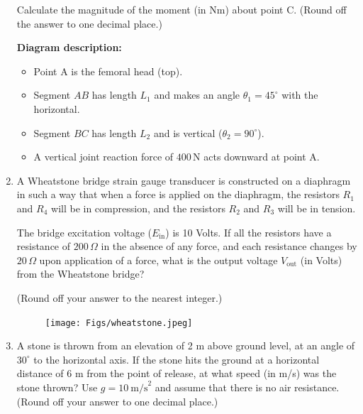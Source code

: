 \documentclass[journal]{IEEEtran}
\begin{document}
\begin{enumerate}
Calculate the magnitude of the moment (in Nm) about point C. (Round off the answer to one decimal place.)

\vspace{1em}
\textbf{Diagram description:}

\begin{itemize}
  \item Point A is the femoral head (top).
  \item Segment \( AB \) has length \( L_1 \) and makes an angle \( \theta_1 = 45^\circ \) with the horizontal.
  \item Segment \( BC \) has length \( L_2 \) and is vertical (\( \theta_2 = 90^\circ \)).
  \item A vertical joint reaction force of \( 400 \, \text{N} \) acts downward at point A.
\end{itemize}
\hfill{}

\item 
A Wheatstone bridge strain gauge transducer is constructed on a diaphragm in such a way that when a force is applied on the diaphragm, the resistors \( R_1 \) and \( R_4 \) will be in compression, and the resistors \( R_2 \) and \( R_3 \) will be in tension.

\vspace{1em}
The bridge excitation voltage (\( E_{\text{in}} \)) is 10 Volts. If all the resistors have a resistance of \( 200 \, \Omega \) in the absence of any force, and each resistance changes by \( 20 \, \Omega \) upon application of a force, what is the output voltage \( V_{\text{out}} \) (in Volts) from the Wheatstone bridge? 

(Round off your answer to the nearest integer.)
\begin{figure}[H]
    \centering
    \texttt{[image: Figs/wheatstone.jpeg]} 
    \caption{}
    \label{fig:placeholder}
\end{figure}
\hfill{}

\item 
A stone is thrown from an elevation of 2 m above ground level, at an angle of \(30^\circ\) to the horizontal axis. If the stone hits the ground at a horizontal distance of 6 m from the point of release, at what speed (in m/s) was the stone thrown? Use \(g = 10~\text{m/s}^2\) and assume that there is no air resistance. (Round off your answer to one decimal place.)

\begin{tikzpicture}[scale=1.2]


\end{tikzpicture}
\end{enumerate}
\end{document}
